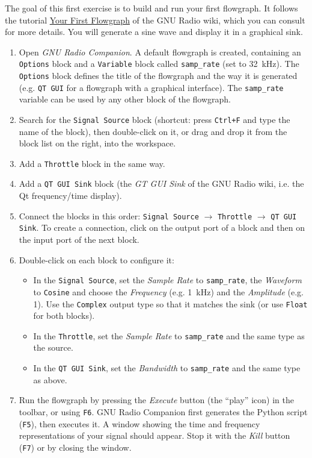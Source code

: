 The goal of this first exercise is to build and run your first flowgraph. It follows the tutorial \href{https://wiki.gnuradio.org/index.php?title=Your_First_Flowgraph}{Your First Flowgraph} of the GNU Radio wiki, which you can consult for more details. You will generate a sine wave and display it in a graphical sink.

\begin{enumerate}
    \item Open \emph{GNU Radio Companion}. A default flowgraph is created, containing an \texttt{Options} block and a \texttt{Variable} block called \texttt{samp\_rate} (set to \SI{32}{\kilo\hertz}). The \texttt{Options} block defines the title of the flowgraph and the way it is generated (e.g. \texttt{QT GUI} for a flowgraph with a graphical interface). The \texttt{samp\_rate} variable can be used by any other block of the flowgraph.
    \item Search for the \texttt{Signal Source} block (shortcut: press \texttt{Ctrl+F} and type the name of the block), then double-click on it, or drag and drop it from the block list on the right, into the workspace.
    \item Add a \texttt{Throttle} block in the same way.
    \item Add a \texttt{QT GUI Sink} block (the \emph{GT GUI Sink} of the GNU Radio wiki, i.e. the Qt frequency/time display).
    \item Connect the blocks in this order: \texttt{Signal Source} $\rightarrow$ \texttt{Throttle} $\rightarrow$ \texttt{QT GUI Sink}. To create a connection, click on the output port of a block and then on the input port of the next block.
    \item Double-click on each block to configure it:
    \begin{itemize}
        \item In the \texttt{Signal Source}, set the \emph{Sample Rate} to \texttt{samp\_rate}, the \emph{Waveform} to \texttt{Cosine} and choose the \emph{Frequency} (e.g. \SI{1}{\kilo\hertz}) and the \emph{Amplitude} (e.g. 1). Use the \texttt{Complex} output type so that it matches the sink (or use \texttt{Float} for both blocks).
        \item In the \texttt{Throttle}, set the \emph{Sample Rate} to \texttt{samp\_rate} and the same type as the source.
        \item In the \texttt{QT GUI Sink}, set the \emph{Bandwidth} to \texttt{samp\_rate} and the same type as above.
    \end{itemize}
    \item Run the flowgraph by pressing the \emph{Execute} button (the ``play'' icon) in the toolbar, or using \texttt{F6}. GNU Radio Companion first generates the Python script (\texttt{F5}), then executes it. A window showing the time and frequency representations of your signal should appear. Stop it with the \emph{Kill} button (\texttt{F7}) or by closing the window.
\end{enumerate}

